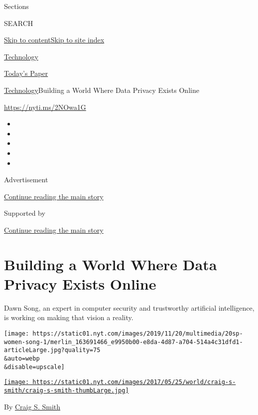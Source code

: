 Sections

SEARCH

\protect\hyperlink{site-content}{Skip to
content}\protect\hyperlink{site-index}{Skip to site index}

\href{https://www.nytimes.com/section/technology}{Technology}

\href{https://myaccount.nytimes.com/auth/login?response_type=cookie\&client_id=vi}{}

\href{https://www.nytimes.com/section/todayspaper}{Today's Paper}

\href{/section/technology}{Technology}\textbar{}Building a World Where
Data Privacy Exists Online

\href{https://nyti.ms/2NOwa1G}{https://nyti.ms/2NOwa1G}

\begin{itemize}
\item
\item
\item
\item
\item
\end{itemize}

Advertisement

\protect\hyperlink{after-top}{Continue reading the main story}

Supported by

\protect\hyperlink{after-sponsor}{Continue reading the main story}

\hypertarget{building-a-world-where-data-privacy-exists-online}{%
\section{Building a World Where Data Privacy Exists
Online}\label{building-a-world-where-data-privacy-exists-online}}

Dawn Song, an expert in computer security and trustworthy artificial
intelligence, is working on making that vision a reality.

\texttt{[image: https://static01.nyt.com/images/2019/11/20/multimedia/20sp-women-song-1/merlin\_163691466\_e9950b00-e8da-4d87-a704-514a4c31dfd1-articleLarge.jpg?quality=75\\\&auto=webp\\\&disable=upscale]}

\href{https://www.nytimes.com/by/craig-s-smith}{\texttt{[image: https://static01.nyt.com/images/2017/05/25/world/craig-s-smith/craig-s-smith-thumbLarge.jpg]}}

By \href{https://www.nytimes.com/by/craig-s-smith}{Craig S. Smith}

